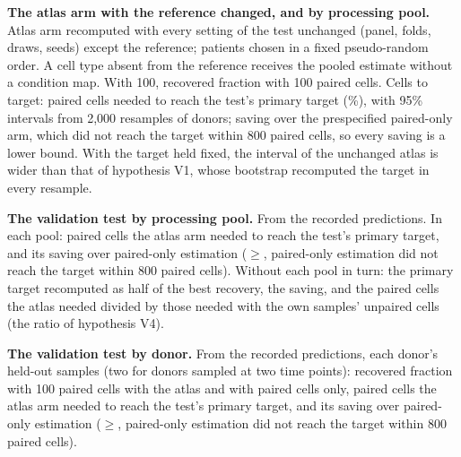\begin{table}[h]
\caption{\textbf{The atlas arm with the reference changed, and by processing pool.} Atlas arm recomputed with every setting of the test unchanged (panel, folds, draws, seeds) except the reference; patients chosen in a fixed pseudo-random order. A cell type absent from the reference receives the pooled estimate without a condition map. With 100, recovered fraction with 100 paired cells. Cells to target: paired cells needed to reach the test's primary target (\VlTarget\%), with 95\% intervals from 2,000 resamples of donors; saving over the prespecified paired-only arm, which did not reach the target within 800 paired cells, so every saving is a lower bound. With the target held fixed, the interval of the unchanged atlas is wider than that of hypothesis V1, whose bootstrap recomputed the target in every resample.}
\label{tab:robust}
\centering\footnotesize

\end{table}

\begin{table}[h]
\caption{\textbf{The validation test by processing pool.} From the recorded predictions. In each pool: paired cells the atlas arm needed to reach the test's primary target, and its saving over paired-only estimation ($\geq$, paired-only estimation did not reach the target within 800 paired cells). Without each pool in turn: the primary target recomputed as half of the best recovery, the saving, and the paired cells the atlas needed divided by those needed with the own samples' unpaired cells (the ratio of hypothesis V4).}
\label{tab:pools}
\centering\footnotesize

\end{table}

\begin{table}[h]
\caption{\textbf{The validation test by donor.} From the recorded predictions, each donor's held-out samples (two for donors sampled at two time points): recovered fraction with 100 paired cells with the atlas and with paired cells only, paired cells the atlas arm needed to reach the test's primary target, and its saving over paired-only estimation ($\geq$, paired-only estimation did not reach the target within 800 paired cells).}
\label{tab:donors}
\centering\footnotesize

\end{table}
